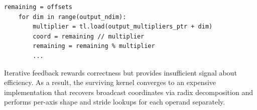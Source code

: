 \begin{lstlisting}[style=papercode]
    remaining = offsets
    for dim in range(output_ndim):
        multiplier = tl.load(output_multipliers_ptr + dim)
        coord = remaining // multiplier
        remaining = remaining % multiplier
        ...
\end{lstlisting}

Iterative feedback rewards correctness but provides insufficient signal about efficiency. As a result, the surviving kernel converges to an expensive implementation that recovers broadcast coordinates via radix decomposition and performs per-axis shape and stride lookups for each operand separately.